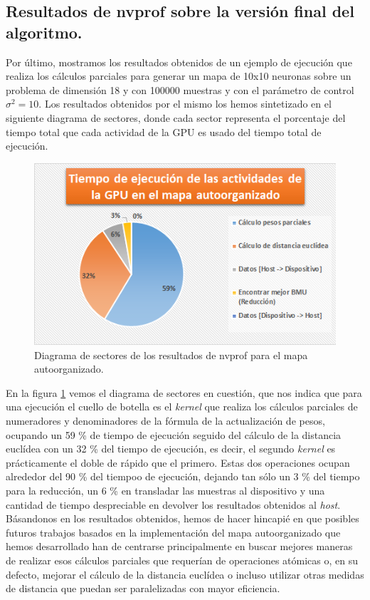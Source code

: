 \subsection{Resultados de nvprof sobre la versión final del algoritmo.}
Por último, mostramos los resultados obtenidos de un ejemplo de ejecución que realiza los cálculos parciales para generar un mapa de 10x10 neuronas sobre un problema de dimensión 18 y con 100000 muestras y con el parámetro de control $\sigma^2=10$. Los resultados obtenidos por el mismo los hemos sintetizado en el siguiente diagrama de sectores, donde cada sector representa el porcentaje del tiempo total que cada actividad de la GPU es usado del tiempo total de ejecución. \\

\begin{figure}[ht]
\centering
\includegraphics[scale=0.9]{imagenes/profilesomquesito.png}
\caption{Diagrama de sectores de los resultados de nvprof para el mapa autoorganizado.}
\label{img:somquesito}
\end{figure}

En la figura \ref{img:somquesito} vemos el diagrama de sectores en cuestión, que nos indica que para una ejecución el cuello de botella es el \textit{kernel} que realiza los cálculos parciales de numeradores y denominadores de la fórmula de la actualización de pesos, ocupando un 59 \% de tiempo de ejecución seguido del cálculo de la distancia euclídea con un 32 \% del tiempo de ejecución, es decir, el segundo \textit{kernel} es prácticamente el doble de rápido que el primero. Estas dos operaciones ocupan alrededor del 90 \% del tiempoo de ejecución, dejando tan sólo un 3 \% del tiempo para la reducción, un 6 \% en transladar las muestras al dispositivo y una cantidad de tiempo despreciable en devolver los resultados obtenidos al \textit{host}. Básandonos en los resultados obtenidos, hemos de hacer hincapié en que posibles futuros trabajos basados en la implementación del mapa autoorganizado que hemos desarrollado han de centrarse principalmente en buscar mejores maneras de realizar esos cálculos parciales que requerían de operaciones atómicas o, en su defecto, mejorar el cálculo de la distancia euclídea o incluso utilizar otras medidas de distancia que puedan ser paralelizadas con mayor eficiencia.

